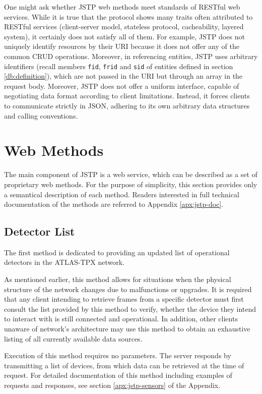 One might ask whether JSTP web methods meet standards of RESTful web services. While it is true that the protocol shows many traits often attributed to RESTful services (client-server model, stateless protocol, cacheability, layered system), it certainly does not satisfy all of them. For example, JSTP does not uniquely identify resources by their URI because it does not offer any of the common CRUD operations. Moreover, in referencing entities, JSTP uses arbitrary identifiers (recall members \texttt{fid}, \texttt{frid} and \texttt{sid} of entities defined in section \ref{db:definition}), which are not passed in the URI but through an array in the request body. Moreover, JSTP does not offer a uniform interface, capable of negotiating data format according to client limitations. Instead, it forces clients to communicate strictly in JSON, adhering to its own arbitrary data structures and calling conventions.

\section{Web Methods}
\label{jstp:web-methods}
The main component of JSTP is a web service, which can be described as a set of proprietary web methods. For the purpose of simplicity, this section provides only a semantical description of each method. Readers interested in full technical documentation of the methods are referred to Appendix \ref{apx:jstp-doc}.

\subsection{Detector List}
The first method is dedicated to providing an updated list of operational detectors in the ATLAS-TPX network.

As mentioned earlier, this method allows for situations when the physical structure of the network changes due to malfunctions or upgrades. It is required that any client intending to retrieve frames from a specific detector must first consult the list provided by this method to verify, whether the device they intend to interact with is still connected and operational. In addition, other clients unaware of network's architecture may use this method to obtain an exhaustive listing of all currently available data sources.

Execution of this method requires no parameters. The server responds by transmitting a list of devices, from which data can be retrieved at the time of request. For detailed documentation of this method including examples of requests and responses, see section \ref{apx:jstp-sensors} of the Appendix.


